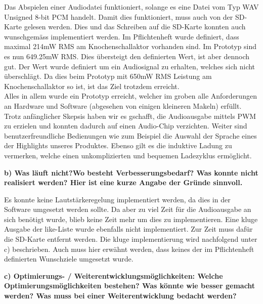 Das Abspielen einer Audiodatei funktioniert, solange es eine Datei vom Typ WAV Unsigned 8-bit PCM handelt. Damit dies funktioniert, muss auch von der SD-Karte gelesen werden. Dies und das Schreiben auf die SD-Karte konnten auch wunschgemäss implementiert werden. Im Pflichtenheft wurde definiert, dass maximal 214mW RMS am Knochenschallaktor vorhanden sind. Im Prototyp sind es nun 649.25mW RMS. Dies übersteigt den definierten Wert, ist aber dennoch gut. Der Wert wurde definiert um ein Audiosignal zu erhalten, welches sich nicht überschlägt. Da dies beim Prototyp mit 650mW RMS Leistung am Knochenschallaktor so ist, ist das Ziel trotzdem erreicht. \\
 
Alles in allem wurde ein Prototyp erreicht, welcher im groben alle Anforderungen an Hardware und Software (abgesehen von einigen kleineren Makeln) erfüllt. Trotz anfänglicher Skepsis haben wir es gschafft, die Audioausgabe mittels PWM zu erzielen und konnten dadurch auf einen Audio-Chip verzichten. Weiter sind benutzerfreundliche Bedienungen wie zum Beispiel die Auswahl der Sprache eines der Highlights unseres Produktes. Ebenso gilt es die induktive Ladung zu vermerken, welche einen unkomplizierten und bequemen Ladezyklus ermöglicht.

\textbf{b) Was läuft nicht?Wo besteht Verbesserungsbedarf? Was konnte nicht realisiert werden? Hier ist eine kurze Angabe der Gründe sinnvoll.}

Es konnte keine Lautstärkeregelung implementiert werden, da dies in der Software umgesetzt werden sollte. Da aber zu viel Zeit für die Audioausgabe an sich benötigt wurde, blieb keine Zeit mehr um dies zu implementieren. Eine kluge Ausgabe der like-Liste wurde ebenfalls nicht implementiert. Zur Zeit muss dafür die SD-Karte entfernt werden. Die kluge implementierung wird nachfolgend unter c) beschrieben.  Auch muss hier erwähnt werden, dass keines der im Pflichtenheft definierten Wunschziele umgesetzt wurde. 
 
 
\textbf{c) Optimierungs- / Weiterentwicklungsmöglichkeiten: Welche Optimierungsmöglichkeiten bestehen? Was könnte wie besser gemacht werden? Was muss bei einer Weiterentwicklung bedacht werden?}

